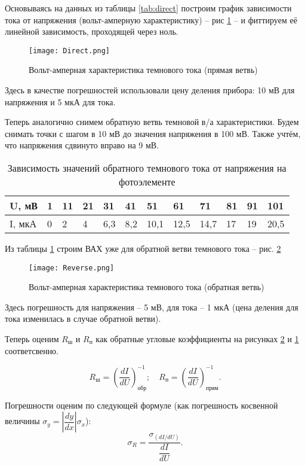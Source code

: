 \documentclass[a4paper,12pt]{article} %
\begin{document}
Основываясь на данных из таблицы 
\ref{tab:direct} построим график зависимости тока от напряжения (вольт-амперную характеристику) -- рис \ref{fig:direct} -- и фиттируем её линейной зависимость, проходящей через ноль.

\begin{figure}[H]
    \centering
    \texttt{[image: Direct.png]}
    \caption{Вольт-амперная характеристика темнового тока (прямая ветвь)}
    \label{fig:direct}
\end{figure}

Здесь в качестве погрешностей использовали цену деления прибора: 10 мВ для напряжения и 5 мкА для тока.

Теперь аналогично снимем обратную ветвь темновой в/а характеристики. Будем снимать точки с шагом в 10 мВ до значения напряжения в 100 мВ. Также учтём, что напряжения сдвинуто вправо на 9 мВ.

\begin{table}[H]
\centering
\caption{Зависимость значений обратного темнового тока от напряжения на фотоэлементе}
\begin{tabular}{|l|l|l|l|l|l|l|l|l|l|l|l|}
\hline
U, мВ  & 1 & 11 & 21 & 31  & 41  & 51   & 61   & 71   & 81 & 91 & 101  \\ \hline
I, мкА & 0 & 2  & 4  & 6,3 & 8,2 & 10,1 & 12,5 & 14,7 & 17 & 19 & 20,5 \\ \hline
\end{tabular}
\label{tab:reverse}
\end{table}

Из таблицы \ref{tab:reverse} строим ВАХ уже для обратной ветви темнового тока -- рис. \ref{fig:reverse}

\begin{figure}[H]
    \centering
    \texttt{[image: Reverse.png]}
    \caption{Вольт-амперная характеристика темнового тока (обратная ветвь)}
    \label{fig:reverse}
\end{figure}

Здесь погрешность для напряжения -- 5 мВ, для тока -- 1 мкА (цена деления для тока изменилась в случае обратной ветви).

Теперь оценим $R_\text{ш}$ и $R_\text{п}$ как обратные угловые коэффициенты на рисунках \ref{fig:reverse} и \ref{fig:direct} соответсвенно.

\[R_\text{ш} = \left( \dfrac{dI}{dU} \right)^{-1}_\text{обр}; \quad R_\text{п} = \left( \dfrac{dI}{dU} \right)^{-1}_\text{прям}. \]

Погрешности оценим по следующей формуле (как погрешность косвенной величины $\sigma_y = \left| \dfrac{dy}{dx} \right| \sigma_x$):
\[ \sigma_R = \dfrac{\sigma_{(dI/dU)}}{\dfrac{dI}{dU}}.\]
\end{document}
